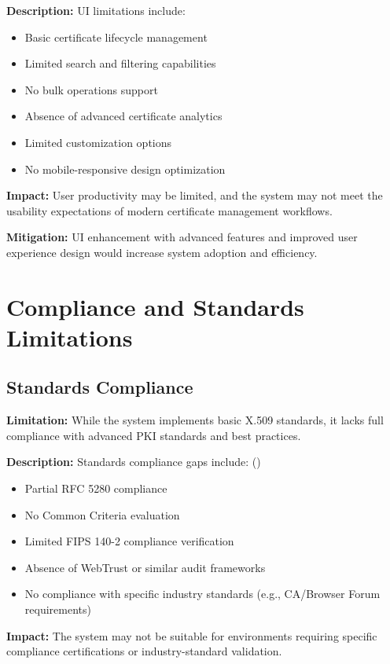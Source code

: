 \textbf{Description:} UI limitations include:
\begin{itemize}
    \item Basic certificate lifecycle management
    \item Limited search and filtering capabilities
    \item No bulk operations support
    \item Absence of advanced certificate analytics
    \item Limited customization options
    \item No mobile-responsive design optimization
\end{itemize}

\textbf{Impact:} User productivity may be limited, and the system may not meet the usability expectations of modern certificate management workflows.

\textbf{Mitigation:} UI enhancement with advanced features and improved user experience design would increase system adoption and efficiency.

\section{Compliance and Standards Limitations}

\subsection{Standards Compliance}

\textbf{Limitation:} While the system implements basic X.509 standards, it lacks full compliance with advanced PKI standards and best practices.

\textbf{Description:} Standards compliance gaps include: ({\color{red}{TODO: Check}})
\begin{itemize}
    \item Partial RFC 5280 compliance
    \item No Common Criteria evaluation
    \item Limited FIPS 140-2 compliance verification
    \item Absence of WebTrust or similar audit frameworks
    \item No compliance with specific industry standards (e.g., CA/Browser Forum requirements)
\end{itemize}

\textbf{Impact:} The system may not be suitable for environments requiring specific compliance certifications or industry-standard validation.

